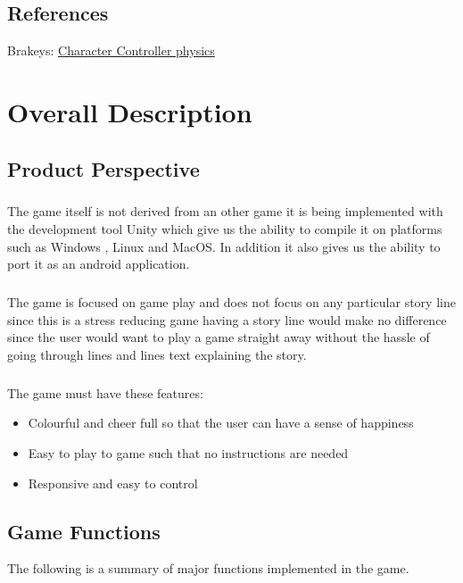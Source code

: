 \section{References}
 Brakeys: \href{https://github.com/Brackeys/2D-Character-Controller}{Character Controller physics}


\chapter{Overall Description}
\label{Overall Description}

\section{Product Perspective}
\paragraph{}The game itself is not derived from an other game it is being implemented with the development tool Unity which give us the ability to compile it on platforms such as Windows , Linux and MacOS. In addition it also gives us the ability to port it as an android application.

\paragraph{}The game is focused on game play and does not focus on any particular story line since this is a stress reducing game having a story line would make no difference since the user would want to play a game straight away without the hassle of going through lines and lines text explaining the story.

\paragraph{} The game must have these features:
\begin{itemize}
    \item Colourful and cheer full so that the user can have a sense of happiness 
    \item Easy to play to game such that no instructions are needed 
    \item Responsive and easy to control  
\end{itemize}
\section{Game Functions}
The following is a summary of major functions implemented in the game.
